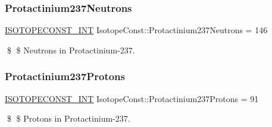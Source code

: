 \subsubsection{\texorpdfstring{Protactinium237\+Neutrons}{Protactinium237Neutrons}}
{\footnotesize\ttfamily \mbox{\hyperlink{group___isotope_const-_macros_ga5f18360b3e99483a35c32d789e62621c}{I\+S\+O\+T\+O\+P\+E\+C\+O\+N\+S\+T\+\_\+\+I\+NT}} Isotope\+Const\+::\+Protactinium237\+Neutrons = 146}

\$ \$ Neutrons in Protactinium-\/237. \mbox{\label{group___isotope_const-_protactinium-_pa237_gadf1bbe872af2c4711a9eb4d3bfc39a20}} 
\subsubsection{\texorpdfstring{Protactinium237\+Protons}{Protactinium237Protons}}
{\footnotesize\ttfamily \mbox{\hyperlink{group___isotope_const-_macros_ga5f18360b3e99483a35c32d789e62621c}{I\+S\+O\+T\+O\+P\+E\+C\+O\+N\+S\+T\+\_\+\+I\+NT}} Isotope\+Const\+::\+Protactinium237\+Protons = 91}

\$ \$ Protons in Protactinium-\/237. 